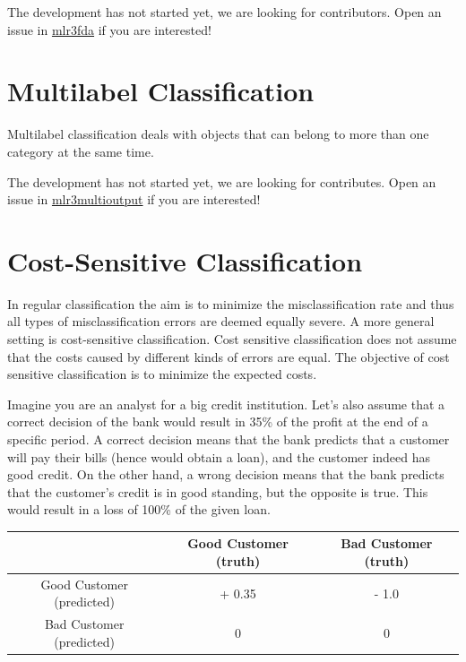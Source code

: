 \documentclass[
]{scrbook}
\begin{document}
The development has not started yet, we are looking for contributors.
Open an issue in \href{https://github.com/mlr-org/mlr3fda}{mlr3fda} if you are interested!

\hypertarget{multilabel}{%
\section{Multilabel Classification}\label{multilabel}}

Multilabel classification deals with objects that can belong to more than one category at the same time.

The development has not started yet, we are looking for contributes.
Open an issue in \href{https://github.com/mlr-org/mlr3multioutput}{mlr3multioutput} if you are interested!

\hypertarget{cost-sens}{%
\section{Cost-Sensitive Classification}\label{cost-sens}}

In regular classification the aim is to minimize the misclassification rate and thus all types of misclassification errors are deemed equally severe.
A more general setting is cost-sensitive classification.
Cost sensitive classification does not assume that the costs caused by different kinds of errors are equal.
The objective of cost sensitive classification is to minimize the expected costs.

Imagine you are an analyst for a big credit institution.
Let's also assume that a correct decision of the bank would result in 35\% of the profit at the end of a specific period.
A correct decision means that the bank predicts that a customer will pay their bills (hence would obtain a loan), and the customer indeed has good credit.
On the other hand, a wrong decision means that the bank predicts that the customer's credit is in good standing, but the opposite is true.
This would result in a loss of 100\% of the given loan.

\begin{longtable}[]{@{}ccc@{}}
\toprule
& Good Customer (truth) & Bad Customer (truth) \\
\midrule
\endhead
Good Customer (predicted) & + 0.35 & - 1.0 \\
Bad Customer (predicted) & 0 & 0 \\
\bottomrule
\end{longtable}
\end{document}
